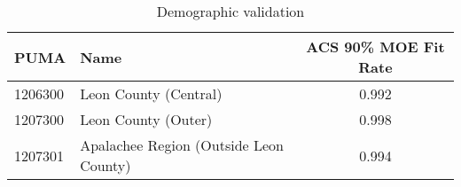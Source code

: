 \begin{table}[htb]
\caption{Demographic validation}
\label{tab:demographic-validation}
\small
\vspace{-6pt}
\begin{center}
\begin{tabular}{l | p{3.25cm} | c}
\toprule
\bf PUMA & \bf Name & \bf ACS 90\% MOE Fit Rate\\
\midrule
1206300 & Leon County (Central) & 0.992 \\
1207300 & Leon County (Outer) &  0.998 \\
1207301 & Apalachee Region (Outside Leon County) & 0.994 \\
\bottomrule
\end{tabular}
\end{center}
\end{table}